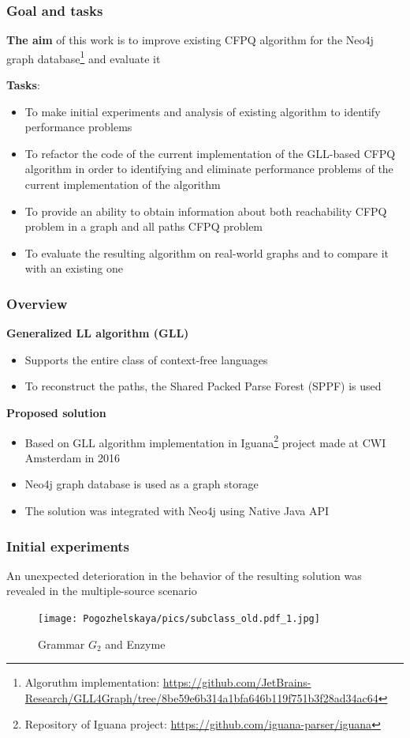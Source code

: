 \documentclass{beamer}
\begin{document}
\begin{frame}
  \transwipe[direction=90]
  \frametitle{Goal and tasks}
  \textbf{The aim} of this work is to improve existing CFPQ
algorithm for the Neo4j graph database\footnote{Algoruthm implementation: \url{https://github.com/JetBrains-Research/GLL4Graph/tree/8be59e6b314a1bfa646b119f751b3f28ad34ac64}} and evaluate it
  
  \textbf{Tasks}:
  \begin{itemize}
  \item To make initial experiments and analysis of existing algorithm to identify performance problems
    \item To refactor the code of the current implementation of the GLL-based CFPQ algorithm in order to identifying and eliminate performance problems of the current implementation of the algorithm
    \item To provide an ability to obtain information about both reachability CFPQ problem in a graph and all paths CFPQ problem
    \item To evaluate the resulting algorithm on real-world graphs and to compare it with an existing one
\end{itemize}
\end{frame}

\begin{frame}
  \transwipe[direction=90]
  \frametitle{Overview}
  \textbf{Generalized LL algorithm (GLL)}
\begin{itemize}
    \item Supports the entire class of context-free languages
    \item To reconstruct the paths, the Shared Packed Parse Forest (SPPF) is used
\end{itemize}
\textbf{Proposed solution}\\
  \begin{itemize}
    \item Based on GLL algorithm implementation in Iguana\footnote{ Repository of Iguana project: \url{https://github.com/iguana-parser/iguana}} project made at CWI Amsterdam in 2016
    \item Neo4j graph database is used as a graph storage
    \item The solution was integrated with Neo4j using Native Java API
  \end{itemize}
  \end{frame}
  
  \begin{frame}
  \transwipe[direction=90]
 \frametitle{Initial experiments}
An unexpected deterioration in the behavior of the resulting solution was revealed in the multiple-source scenario
    
\begin{figure}[H]
\centering
\texttt{[image: Pogozhelskaya/pics/subclass\_old.pdf\_1.jpg]}
\label{fig:arch}
\caption{Grammar $G_2$ and Enzyme}
\end{figure}
\end{frame}
  
\end{document}
